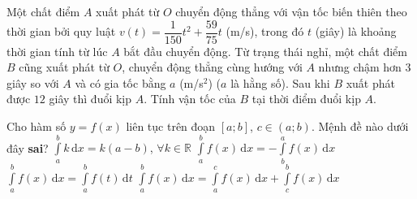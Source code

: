 \begin{ex}%
	Một chất điểm $A$ xuất phát từ $O$ chuyển động thẳng với vận tốc biến thiên theo thời gian bởi quy luật $v(t)=\dfrac{1}{150}t^2+\dfrac{59}{75}t$ (m/s), trong đó $t$ (giây) là khoảng thời gian tính từ lúc $A$ bắt đầu chuyển động. Từ trạng thái nghỉ, một chất điểm $B$ cũng xuất phát từ $O$, chuyển động thẳng cùng hướng với $A$ nhưng chậm hơn $3$ giây so với $A$ và có gia tốc bằng $a$ (m/s$^2$) ($a$	là hằng số). Sau khi $B$ xuất phát được $12$ giây thì đuổi kịp $A$. Tính vận tốc của $B$ tại thời điểm đuổi kịp $A$. 
\end{ex}

\begin{ex}%
	Cho hàm số $y=f(x)$ liên tục trên đoạn $[a;b]$, $c\in(a;b)$. Mệnh đề nào dưới đây \textbf{sai}?
	\haicot
	{\True $\displaystyle\int\limits_a^bk\mathrm{\,d}x=k(a-b)$, $\forall k\in\mathbb{R}$}
	{$\displaystyle\int\limits_a^bf(x)\mathrm{\,d}x=-\displaystyle\int\limits_b^af(x)\mathrm{\,d}x$}
	{$\displaystyle\int\limits_a^bf(x)\mathrm{\,d}x=\displaystyle\int\limits_a^bf(t)\mathrm{\,d}t$}
	{$\displaystyle\int\limits_a^bf(x)\mathrm{\,d}x=\displaystyle\int\limits_a^cf(x)\mathrm{\,d}x+\displaystyle\int\limits_c^bf(x)\mathrm{\,d}x$}
\end{ex}

